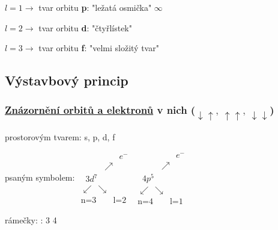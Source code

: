 \documentclass{article}
\begin{document}
    \vspace{2em}
    \raggedright
    $l = 1 \to $ tvar orbitu \textbf{p}: "ležatá osmička" \tab \hspace{2em} \huge{$\infty$}

    \normalsize
    
    $l = 2 \to $ tvar orbitu \textbf{d}: "čtyřlístek"
    
    \vspace{2em}

    $l = 3 \to $ tvar orbitu \textbf{f}: "velmi složitý tvar"


\raggedright

\subsection{Výstavbový princip}
    \subsubsection{\underline{Znázornění orbitů a elektronů} v nich ($\downarrow \uparrow,~ \uparrow \uparrow,~ \downarrow\downarrow$)}
    \begin{description}
        \TabPositions{0em, 12em}
        \vspace{1em}
        \item[a)] prostorovým tvarem: \tab s, p, d, f
        \vspace{2em}
        \item[b)] psaným symbolem: \tab \(
            \begin{array}{c}
                \qquad\qquad\;\; e^-\\
                \qquad \;\;\; \nearrow \\
                \;\;3d^7 \\
                \swarrow~\searrow \\
                \mbox{n=3} \qquad \mbox{l=2}
            \end{array}
        \)
        \hspace{6em}
        \(
            \begin{array}{c}
                \qquad\qquad\;\; e^-\\
                \qquad \;\;\; \nearrow \\
                \;\;4p^5 \\
                \swarrow~\searrow \\
                \mbox{n=4} \qquad \mbox{l=1}
            \end{array}
        \)
        \vspace{2em}
        \item[c)] rámečky: \tab  : 3 \fbox{$\downarrow\uparrow$}\fbox{$\downarrow\uparrow$}\fbox{$\downarrow$ }\fbox{$\downarrow$ }\fbox{$\downarrow$ } \hspace{3em} 4 \fbox{$\downarrow\uparrow$}\fbox{$\downarrow\uparrow$}\fbox{$\downarrow$ }
    \end{description}
    
\end{document}
